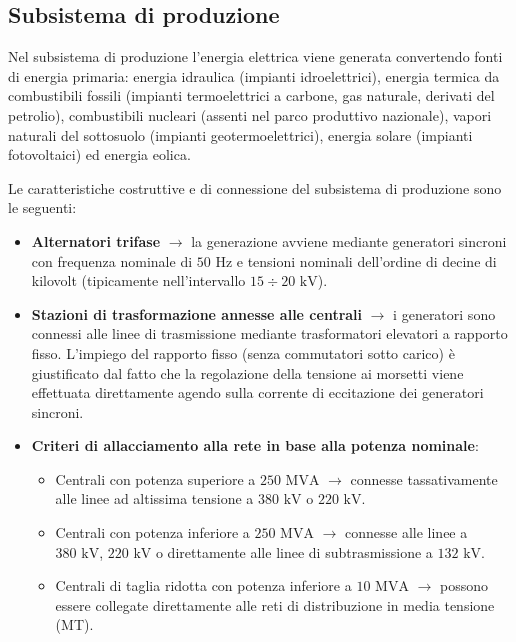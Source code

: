\subsection{Subsistema di produzione}
Nel subsistema di produzione l'energia elettrica viene generata convertendo fonti di energia primaria: energia idraulica (impianti idroelettrici), energia termica da combustibili fossili (impianti termoelettrici a carbone, gas naturale, derivati del petrolio), combustibili nucleari (assenti nel parco produttivo nazionale), vapori naturali del sottosuolo (impianti geotermoelettrici), energia solare (impianti fotovoltaici) ed energia eolica.

Le caratteristiche costruttive e di connessione del subsistema di produzione sono le seguenti:
\begin{itemize}
    \item \textbf{Alternatori trifase} $\rightarrow$ la generazione avviene mediante generatori sincroni con frequenza nominale di $50\text{ Hz}$ e tensioni nominali dell'ordine di decine di kilovolt (tipicamente nell'intervallo $15 \div 20\text{ kV}$).
    \item \textbf{Stazioni di trasformazione annesse alle centrali} $\rightarrow$ i generatori sono connessi alle linee di trasmissione mediante trasformatori elevatori a rapporto fisso. L'impiego del rapporto fisso (senza commutatori sotto carico) è giustificato dal fatto che la regolazione della tensione ai morsetti viene effettuata direttamente agendo sulla corrente di eccitazione dei generatori sincroni.
    \item \textbf{Criteri di allacciamento alla rete in base alla potenza nominale}:
    \begin{itemize}
        \item Centrali con potenza superiore a $250\text{ MVA}$ $\rightarrow$ connesse tassativamente alle linee ad altissima tensione a $380\text{ kV}$ o $220\text{ kV}$.
        \item Centrali con potenza inferiore a $250\text{ MVA}$ $\rightarrow$ connesse alle linee a $380\text{ kV}$, $220\text{ kV}$ o direttamente alle linee di subtrasmissione a $132\text{ kV}$.
        \item Centrali di taglia ridotta con potenza inferiore a $10\text{ MVA}$ $\rightarrow$ possono essere collegate direttamente alle reti di distribuzione in media tensione (MT).
    \end{itemize}
\end{itemize}

\newpage

